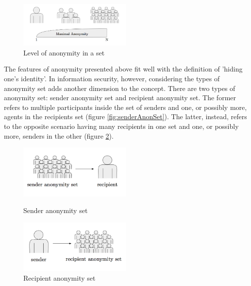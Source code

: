 \begin{figure}[h]
    \centering
    \includegraphics[width=0.50\textwidth]{Images/anonymityLevel.png}
    \caption{Level of anonymity in a set \cite{Franck}}
    \label{fig:anonymity}
\end{figure}

The features of anonymity presented above fit well with the definition of 'hiding one's identity'. 
In information security, however, considering the types of anonymity set adds another dimension to the concept. There are two types of anonymity set: sender anonymity set and recipient anonymity set. The former refers to multiple participants inside the set of senders and one, or possibly more, agents in the recipients set (figure \ref{fig:senderAnonSet}). The latter, instead, refers to the opposite scenario having many recipients in one set and one, or possibly more, senders in the other (figure \ref{fig:receipientAnonSet}).


\begin{figure}[h]
\centering
\begin{minipage}{.5\textwidth}
    \centering
    \includegraphics[width=0.50\textwidth]{Images/ReceiverAnonymSet.png}
    \caption{Sender anonymity set \cite{Franck}}
    \label{fig:senderAnonSet}
\end{minipage}%
\begin{minipage}{.5\textwidth}
    \centering
    \includegraphics[width=0.50\textwidth]{Images/senderAnonymSet.png}
    \caption{Recipient anonymity set \cite{Franck}}
    \label{fig:receipientAnonSet}
\end{minipage}
\end{figure}



